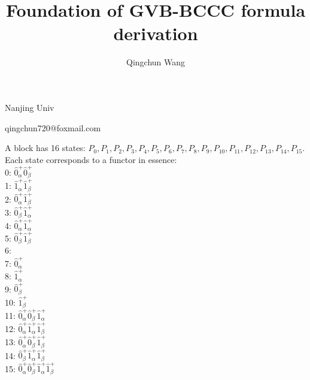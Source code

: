 \documentclass[14pt]{article}
\begin{document}
    \title{Foundation of GVB-BCCC formula derivation}
    \author{Qingchun Wang}
    \maketitle
    \centerline{Nanjing Univ}
    \centerline{qingchun720@foxmail.com}
    
    \linespread{2.0}\selectfont
    \thispagestyle{empty}
    
    \newpage
    \setlength{\parindent}{0pt}
    \setcounter{page}{1}
    
    A block has 16 states: ${P}_{0},{P}_{1},{P}_{2},{P}_{3},{P}_{4},{P}_{5},{P}_{6},{P}_{7},{P}_{8},{P}_{9},{P}_{10},{P}_{11},{P}_{12},{P}_{13},{P}_{14},{P}_{15}. $ \\ 
    Each state corresponds to a functor in essence: \\ 
    0: $\hat{0}_{\alpha}^{+}\hat{0}_{\beta}^{+} $ \\ 
    1: $\hat{1}_{\alpha}^{+}\hat{1}_{\beta}^{+} $ \\ 
    2: $\hat{0}_{\alpha}^{+}\hat{1}_{\beta}^{+} $ \\ 
    3: $\hat{0}_{\beta}^{+}\hat{1}_{\alpha}^{+} $ \\ 
    4: $\hat{0}_{\alpha}^{+}\hat{1}_{\alpha}^{+} $ \\ 
    5: $\hat{0}_{\beta}^{+}\hat{1}_{\beta}^{+} $ \\ 
    6: $ $ \\ 
    7: $\hat{0}_{\alpha}^{+} $ \\ 
    8: $\hat{1}_{\alpha}^{+} $ \\ 
    9: $\hat{0}_{\beta}^{+} $ \\ 
    10: $\hat{1}_{\beta}^{+} $ \\ 
    11: $\hat{0}_{\alpha}^{+}\hat{0}_{\beta}^{+}\hat{1}_{\alpha}^{+} $ \\ 
    12: $\hat{0}_{\alpha}^{+}\hat{1}_{\alpha}^{+}\hat{1}_{\beta}^{+} $ \\ 
    13: $\hat{0}_{\alpha}^{+}\hat{0}_{\beta}^{+}\hat{1}_{\beta}^{+} $ \\ 
    14: $\hat{0}_{\beta}^{+}\hat{1}_{\alpha}^{+}\hat{1}_{\beta}^{+} $ \\ 
    15: $\hat{0}_{\alpha}^{+}\hat{0}_{\beta}^{+}\hat{1}_{\alpha}^{+}\hat{1}_{\beta}^{+} $ \\ 
    
\end{document}
